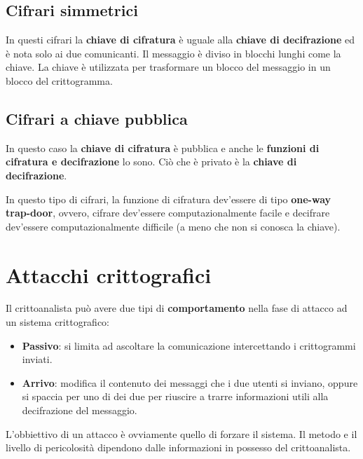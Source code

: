 \subsection{Cifrari simmetrici}
In questi cifrari la \textbf{chiave di cifratura} \`e uguale alla \textbf{chiave di decifrazione} ed \`e nota solo ai
due comunicanti. Il messaggio \`e diviso in blocchi lunghi come la chiave. La chiave \`e utilizzata per trasformare un
blocco del messaggio in un blocco del crittogramma.

\subsection{Cifrari a chiave pubblica}
In questo caso la \textbf{chiave di cifratura} \`e pubblica e anche le \textbf{funzioni di cifratura e decifrazione} lo
sono. Ci\`o che \`e privato \`e la \textbf{chiave di decifrazione}.

In questo tipo di cifrari, la funzione di cifratura dev'essere di tipo \textbf{one-way trap-door}, ovvero, cifrare
dev'essere computazionalmente facile e decifrare dev'essere computazionalmente difficile (a meno che non si conosca
la chiave).

\section{Attacchi crittografici}
Il crittoanalista pu\`o avere due tipi di \textbf{comportamento} nella fase di attacco ad un sistema crittografico:
\begin{itemize}
	\item \textbf{Passivo}: si limita ad ascoltare la comunicazione intercettando i crittogrammi inviati.
	\item \textbf{Arrivo}: modifica il contenuto dei messaggi che i due utenti si inviano, oppure si spaccia per uno di
	      dei due per riuscire a trarre informazioni utili alla decifrazione del messaggio.
\end{itemize}

L'obbiettivo di un attacco \`e ovviamente quello di forzare il sistema. Il metodo e il livello di pericolosit\`a
dipendono dalle informazioni in possesso del crittoanalista.

